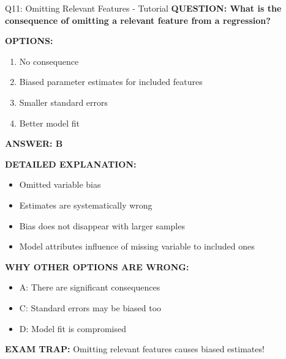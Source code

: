\documentclass[8pt]{beamer}
\begin{document}
	\begin{frame}{Q11: Omitting Relevant Features - Tutorial}
		\fontsize{6.5}{7.5}\selectfont
		\textbf{QUESTION: What is the consequence of omitting a relevant feature from a regression?}
		
		\vspace{0.1cm}
		\textbf{OPTIONS:}
		\begin{enumerate}
			\item No consequence
			\item Biased parameter estimates for included features
			\item Smaller standard errors
			\item Better model fit
		\end{enumerate}
		
		\vspace{0.1cm}
		\textcolor{myblue}{\textbf{ANSWER: B}}
		
		\vspace{0.1cm}
		\textbf{DETAILED EXPLANATION:}
		\begin{itemize}
			\item Omitted variable bias
			\item Estimates are systematically wrong
			\item Bias does not disappear with larger samples
			\item Model attributes influence of missing variable to included ones
		\end{itemize}
		
		\vspace{0.1cm}
		\textcolor{myred}{\textbf{WHY OTHER OPTIONS ARE WRONG:}}
		\begin{itemize}
			\item \textcolor{myred}{A:} There are significant consequences
			\item \textcolor{myred}{C:} Standard errors may be biased too
			\item \textcolor{myred}{D:} Model fit is compromised
		\end{itemize}
		
		\textcolor{myred}{\textbf{EXAM TRAP:}} Omitting relevant features causes \textcolor{myblue}{biased estimates}!
	\end{frame}
	
\end{document}
